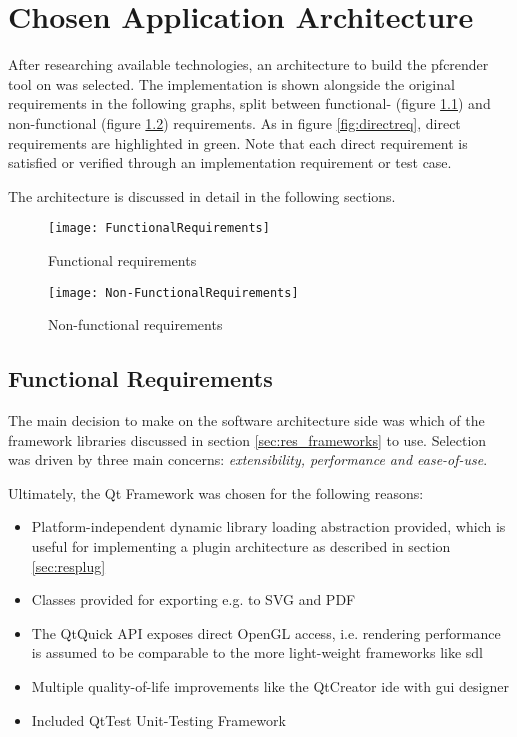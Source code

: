 \chapter{Chosen Application Architecture}

After researching available technologies, an architecture to build the pfcrender tool on was selected. The implementation is shown alongside the original requirements in the following graphs, split between functional- (figure \ref{fr}) and non-functional (figure \ref{nfr}) requirements. As in figure \ref{fig:directreq}, direct requirements are highlighted in green. Note that each direct requirement is satisfied or verified through an implementation requirement or test case.

The architecture is discussed in detail in the following sections.

\begin{figure}[p]
	\texttt{[image: FunctionalRequirements]}
	\caption{Functional requirements}
	\label{fr}
\end{figure}

\begin{figure}[p]
	\texttt{[image: Non-FunctionalRequirements]}
	\caption{Non-functional requirements}
	\label{nfr}
\end{figure}

\section{Functional Requirements}
The main decision to make on the software architecture side was which of the framework libraries discussed in section \ref{sec:res_frameworks} to use.
Selection was driven by three main concerns: \emph{extensibility, performance and ease-of-use}.

Ultimately, the Qt Framework was chosen for the following reasons:
\begin{itemize}
	\item Platform-independent dynamic library loading abstraction provided, which is useful for implementing a plugin architecture as described in section \ref{sec:resplug}
	\item Classes provided for exporting e.g. to SVG and PDF
	\item The QtQuick API exposes direct OpenGL access, i.e. rendering performance is assumed to be comparable to the more light-weight frameworks like \gls{sdl}
	\item Multiple quality-of-life improvements like the QtCreator \gls{ide} with \gls{gui} designer
	\item Included QtTest Unit-Testing Framework
\end{itemize}

